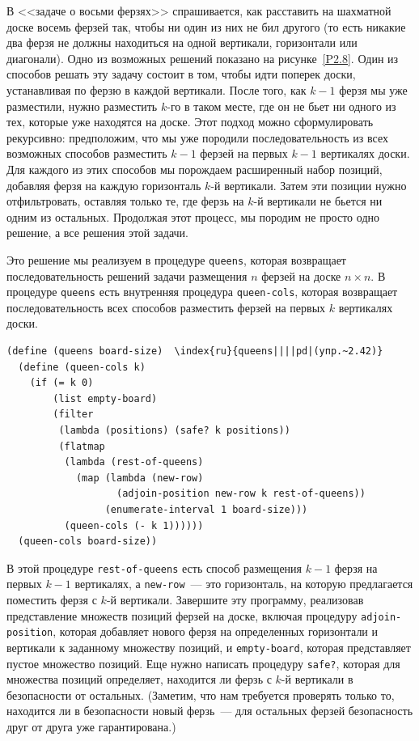 \begin{exercise}{2.42}\label{EX2.42}%
%
%
%
%
В <<задаче о восьми ферзях>> спрашивается, как
расставить на шахматной доске восемь ферзей так, чтобы ни один из них
не бил другого (то есть никакие два ферзя не должны находиться на
одной вертикали, горизонтали или диагонали).  Одно из возможных
решений показано на рисунке~\ref{P2.8}.  Один из способов
решать эту задачу состоит в том, чтобы идти поперек доски,
устанавливая по ферзю в каждой вертикали. После того, как
$k-1$ ферзя мы уже разместили, нужно разместить
$k$-го в таком месте, где он не бьет ни одного из тех,
которые уже находятся на доске.  Этот подход можно сформулировать
рекурсивно: предположим, что мы уже породили последовательность из
всех возможных способов разместить $k-1$ ферзей на первых
$k-1$ вертикалях доски.  Для каждого из этих способов мы
порождаем расширенный набор позиций, добавляя ферзя на каждую
горизонталь $k$-й вертикали.  Затем эти позиции нужно
отфильтровать, оставляя только те, где ферзь на $k$-й
вертикали не бьется ни одним из остальных.  Продолжая этот процесс, мы 
породим не просто одно решение, а все решения этой задачи.

Это решение мы реализуем в процедуре
{\tt queens}, которая возвращает последовательность решений
задачи размещения $n$ ферзей на доске $n \times
n$. В процедуре {\tt queens} есть внутренняя процедура
{\tt queen-cols}, которая возвращает последовательность всех
способов разместить ферзей на первых $k$ вертикалях доски.

\begin{Verbatim}[fontsize=\small]
(define (queens board-size)  \index{ru}{queens||||pd|(упр.~2.42)}
  (define (queen-cols k)
    (if (= k 0)
        (list empty-board)
        (filter
         (lambda (positions) (safe? k positions))
         (flatmap
          (lambda (rest-of-queens)
            (map (lambda (new-row)
                   (adjoin-position new-row k rest-of-queens))
                 (enumerate-interval 1 board-size)))
          (queen-cols (- k 1))))))
  (queen-cols board-size))
\end{Verbatim}
В этой процедуре {\tt rest-of-queens} есть способ размещения
$k-1$ ферзя на первых $k-1$ вертикалях, а
{\tt new-row}~--- это горизонталь, на которую предлагается
поместить ферзя с $k$-й вертикали.  Завершите эту
программу, реализовав представление множеств позиций ферзей на доске, включая 
процедуру {\tt adjoin-position}, которая добавляет нового ферзя 
на определенных горизонтали и вертикали к заданному множеству позиций, 
и {\tt empty-board}, которая представляет пустое множество
позиций.  Еще нужно написать процедуру {\tt safe?}, которая для 
множества позиций определяет, находится ли ферзь с $k$-й
вертикали в безопасности от остальных. (Заметим,
что нам требуется проверять только то, находится ли в безопасности
новый ферзь~--- для остальных ферзей безопасность друг от друга уже
гарантирована.)
\end{exercise}
